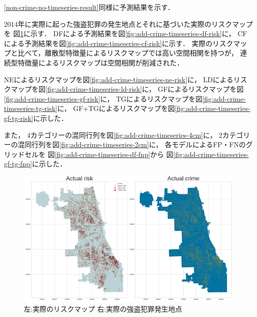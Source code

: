 
\ref{non-crime-no-timeseries-result}同様に予測結果を示す．

2014年に実際に起った強盗犯罪の発生地点とそれに基づいた実際のリスクマップを
図\ref{fig:add-crime-timeseries-actual-risk}に示す．
DFによる予測結果を図\ref{fig:add-crime-timeseries-df-risk}に，
CFによる予測結果を図\ref{fig:add-crime-timeseries-cf-risk}に示す．
実際のリスクマップと比べて，離散型特徴量によるリスクマップでは高い空間相関を持つが，
連続型特徴量によるリスクマップは空間相関が削減された．

NEによるリスクマップを図\ref{fig:add-crime-timeseries-ne-risk}に，
LDによるリスクマップを図\ref{fig:add-crime-timeseries-ld-risk}に，
GFによるリスクマップを図\ref{fig:add-crime-timeseries-gf-risk}に，
TGによるリスクマップを図\ref{fig:add-crime-timeseries-tg-risk}に，
GF+TGによるリスクマップを図\ref{fig:add-crime-timeseries-gf-tg-risk}に示した．


また，
4カテゴリーの混同行列を図\ref{fig:add-crime-timeseries-4cm}に，
2カテゴリーの混同行列を図\ref{fig:add-crime-timeseries-2cm}に，
各モデルによるFP・FNのグリッドセルを
図\ref{fig:add-crime-timeseries-df-fnp}から
図\ref{fig:add-crime-timeseries-gf-tg-fnp}に示した．

\begin{figure}
  \centering %
  \includegraphics[scale=0.25]{./util-fig/actual_risk_point_map.png}
  \caption{左:実際のリスクマップ 右:実際の強盗犯罪発生地点}
  \label{fig:add-crime-timeseries-actual-risk}
\end{figure}

